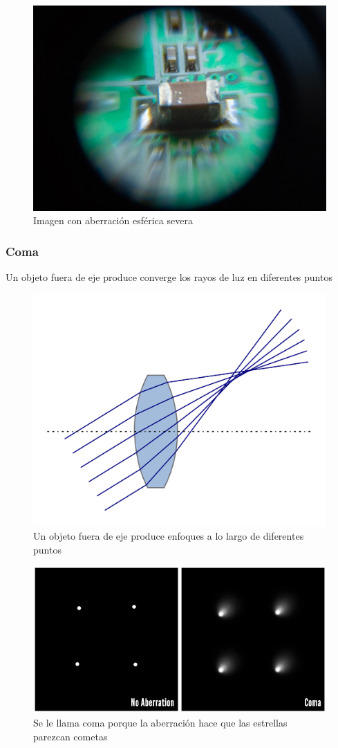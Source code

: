 \documentclass{article}
\begin{document}
\begin{figure}[H]
	\centering
	\includegraphics[width=0.65\linewidth]{Figuras/Spherical_Aberration_2}
	\caption{Imagen con aberración esférica severa}
	\label{fig:sphericalaberration2}
\end{figure}


\subsubsection{Coma}

Un objeto fuera de eje produce converge los rayos de luz en diferentes puntos

\begin{figure}[H]
	\centering
	\includegraphics[width=0.65\linewidth]{Figuras/Coma}
	\caption{Un objeto fuera de eje produce enfoques a lo largo de diferentes puntos}
	\label{fig:coma}
\end{figure}

\begin{figure}[H]
	\centering
	\includegraphics[width=0.65\linewidth]{Figuras/Coma_2}
	\caption{Se le llama coma porque la aberración hace que las estrellas parezcan cometas}
	\label{fig:coma2}
\end{figure}
\end{document}
